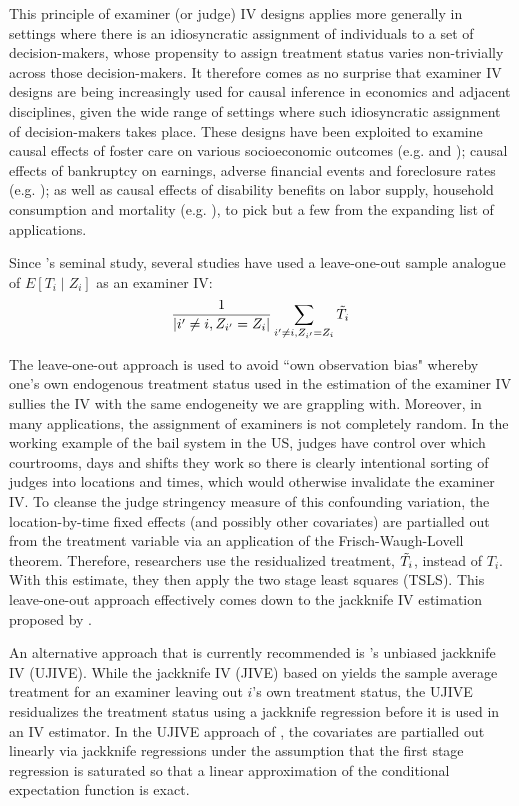 This principle of examiner (or judge) IV designs applies more generally in settings where there is an idiosyncratic assignment of individuals to a set of decision-makers, whose propensity to assign treatment status varies non-trivially across those decision-makers. It therefore comes as no surprise that examiner IV designs are being increasingly used for causal inference in economics and adjacent disciplines, given the wide range of settings where such idiosyncratic assignment of decision-makers takes place. These designs have been exploited to examine causal effects of foster care on various socioeconomic outcomes  (e.g. \citet{gross2022temporary} and \citet{bald2022economics}); causal effects of bankruptcy on earnings, adverse financial events and foreclosure rates (e.g. \cite{dobbie2015debt}); as well as causal effects of disability benefits on labor supply, household consumption and mortality (e.g. \citet{black2018effect}), to pick but a few from the expanding list of applications.

Since \citet{10.1257/aer.96.3.863}'s seminal study, several studies have used a leave-one-out sample analogue of $E\left[T_i \mid Z_i\right]$ as an examiner IV:  $$\frac{1}{\left|i^{\prime} \neq i, Z_{i^{\prime}}=Z_i\right|} \sum_{i^{\prime} \neq i, Z_{i^{\prime}}=Z_i} \Tilde{T_i}$$

The leave-one-out approach is used to avoid ``own observation bias" whereby one's own endogenous treatment status used in the estimation of the examiner IV sullies the IV with the same endogeneity we are grappling with. Moreover, in many applications, the assignment of examiners is not completely random. In the working example of the bail system in the US, judges have control over which courtrooms, days and shifts they work so there is clearly intentional sorting of judges into locations and times, which would otherwise invalidate the examiner IV. To cleanse the judge stringency measure of this confounding variation, the location-by-time fixed effects (and possibly other covariates) are partialled out from the treatment variable via an application of the Frisch-Waugh-Lovell theorem. Therefore, researchers use the residualized treatment, $\Tilde{T_i}$, instead of $T_i$. With this estimate, they then apply the two stage least squares (TSLS). This leave-one-out approach effectively comes down to the jackknife IV estimation proposed by \citet{angrist1999jackknife}. 

An alternative approach that is currently recommended is \citet{kolesarcowles}'s unbiased jackknife IV (UJIVE). While the jackknife IV (JIVE) based on \citet{angrist1999jackknife} yields the sample average treatment for an examiner leaving out  $i$'s own treatment status, the UJIVE residualizes the treatment status using a jackknife regression before it is used in an IV estimator. In the UJIVE approach of \citet{kolesarcowles}, the covariates are partialled out linearly via jackknife regressions under the assumption that the first stage regression is saturated so that a linear approximation of the conditional expectation function is exact. 

